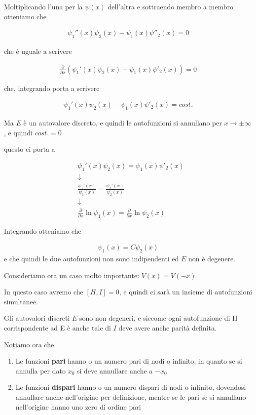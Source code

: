 Moltiplicando l'una per la $\psi(x)$ dell'altra e sottraendo membro a membro otteniamo che 

\begin{align}
\psi_1''(x)\psi_2(x) - \psi_1(x)\psi''_2(x)=0
\end{align}

che è uguale a scrivere

\begin{align}
\frac{\partial}{\partial x}(\psi_1'(x)\psi_2(x) - \psi_1(x)\psi'_2(x))=0
\end{align}

che, integrando porta a scrivere

\begin{align}
\psi_1'(x)\psi_2(x) - \psi_1(x)\psi'_2(x)= cost.
\end{align}

Ma $E$ è un autovalore discreto, e quindi le autofunzioni si annullano per $x \rightarrow \pm \infty$, e quindi $cost.=0$

questo ci porta a

\begin{align}
{}&\psi_1'(x)\psi_2(x) = \psi_1(x)\psi'_2(x) \\
&\downarrow \nonumber \\
&\frac{\psi_1'(x)}{\psi_1(x)}=\frac{\psi_2'(x)}{\psi_2(x)}\\
&\downarrow \nonumber \\
& \frac{\partial}{\partial x} \ln{\psi_1(x)} =  \frac{\partial}{\partial x}\ln{\psi_2(x)}
\end{align}

Integrando otteniamo che

\begin{align}
\psi_1(x) = C \psi_2(x)
\end{align}
e che quindi le due autofunzioni non sono indipendenti ed $E$ non è degenere.

\newpage

Consideriamo ora un caso molto importante: $V(x)=V(-x)$

In questo caso avremo che $[H,I]=0$, e quindi ci sarà un insieme di autofunzioni simultanee.

Gli autovalori discreti $E$ sono non degeneri, e siccome ogni autofunzione di H corrispondente ad E è anche tale di $I$ deve avere anche parità definita.

Notiamo ora che

\begin{enumerate}
	\item Le funzioni \textbf{pari} hanno o un numero pari di nodi o infinito, in quanto se si annulla per dato $x_0$ si deve annullare anche a $-x_0$
	\item Le funzioni \textbf{dispari} hanno o un numero dispari di nodi o infinito, dovendosi annullare anche nell'origine per definizione, mentre se le pari se si annullano nell'origine hanno uno zero di ordine pari
\end{enumerate}

